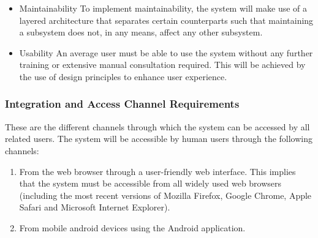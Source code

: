 \documentclass[12pt]{article}
\begin{document}
\begin{itemize}
                							\item Maintainability
                									To implement maintainability, the system will make use of a layered architecture that separates certain counterparts such that maintaining a subsystem does not, in any means, affect any other subsystem.
		              								
                							\item Usability
                									An average user must be able to use the system without any further training or extensive manual consultation required. This will be achieved by the use of design principles to enhance user experience.
		               								
                							
                					\end{itemize} 
                			 
                			\subsubsection{Integration and Access Channel Requirements}
                					These are the different channels through which the system can be accessed by all related users.
	                				The system will be accessible by human users through the following channels:
	                				
			                    	\begin{enumerate}
					                    	\item From the web browser through a user-friendly web interface. This implies that the system must be accessible from all widely used web browsers (including the most recent versions of Mozilla Firefox, Google Chrome, Apple Safari and Microsoft Internet Explorer).
					                    	\item From mobile android devices using the Android application.
			                    	\end{enumerate}  
			                    	  
\end{document}
